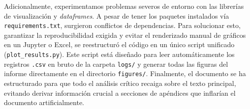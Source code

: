\documentclass[conference, 10pt]{IEEEtran}
\begin{document}
Adicionalmente, experimentamos problemas severos de entorno con las librerías de visualización y \textit{dataframes}. A pesar de tener los paquetes instalados vía \texttt{requirements.txt}, surgieron conflictos de dependencias. Para solucionar esto, garantizar la reproducibilidad exigida y evitar el renderizado manual de gráficos en un Jupyter o Excel, se reestructuró el código en un único script unificado (\texttt{plot\_results.py}). Este script está diseñado para leer automáticamente los registros \texttt{.csv} en bruto de la carpeta \texttt{logs/} y generar todas las figuras del informe directamente en el directorio \texttt{figures/}. Finalmente, el documento se ha estructurado para que todo el análisis crítico recaiga sobre el texto principal, evitando derivar información crucial a secciones de apéndices que inflarían el documento artificialmente.



\end{document}
